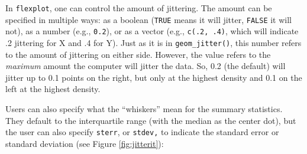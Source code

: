 \documentclass[
  english,
  man]{apa6}
\begin{document}
\normalsize

In \texttt{flexplot}, one can control the amount of jittering. The amount can be specified in multiple ways: as a boolean (\texttt{TRUE} means it will jitter, \texttt{FALSE} it will not), as a number (e.g., \texttt{0.2}), or as a vector (e.g., \texttt{c(.2,\ .4)}, which will indicate .2 jittering for X and .4 for Y). Just as it is in \texttt{geom\_jitter()}, this number refers to the amount of jittering on either side. However, the value refers to the \emph{maximum} amount the computer will jitter the data. So, 0.2 (the default) will jitter up to 0.1 points on the right, but only at the highest density and 0.1 on the left at the highest density.

Users can also specify what the ``whiskers'' mean for the summary statistics. They default to the interquartile range (with the median as the center dot), but the user can also specify \texttt{sterr}, or \texttt{stdev,} to indicate the standard error or standard deviation (see Figure \ref{fig:jitterit}):

\small
\end{document}
